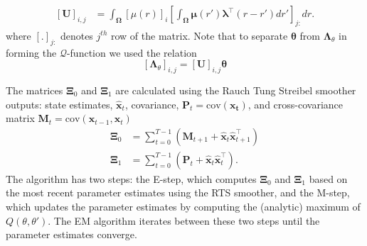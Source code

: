 \documentclass[journal]{IEEEtran}
\newcommand{\cut}[1]{\textcolor{cyan}{#1}}
\begin{document}
\begin{align}
\left[ \mathbf U\right] _{i,j}&=\int_{\boldsymbol \Omega}\left[\mu(r) \right]_i \left[\int_{\boldsymbol\Omega} \boldsymbol\mu\left(r'\right)\boldsymbol \lambda^\top \left(r-r'\right) dr'\right]_{j:} dr.
\end{align}
where $[.]_{j:} $ denotes $j^{th}$ row of the matrix. Note that to separate $\boldsymbol\theta$ from $\boldsymbol\Lambda_{\theta}$ in forming the $\mathcal{Q}$-function we used the relation
\begin{equation}
\left[ \boldsymbol\Lambda_{\theta}\right] _{i,j} =\left[ \mathbf U\right] _{i,j}\boldsymbol\theta
\end{equation}

The matrices $\boldsymbol\Xi_0$ and $\boldsymbol\Xi_1$ are calculated using the Rauch Tung Streibel smoother \cite{RAUCH1965} outputs: state estimates, $\hat{\mathbf x}_t$, covariance, $\mathbf P_t=\mathrm{cov}(\mathbf{x_t})$, and cross-covariance matrix $\mathbf M_t=\mathrm{cov}(\mathbf{x}_{t-1},\mathbf{x}_{t})$ \cite{Gibsona2005}
\begin{align}\label{eq:Xivariables}
\boldsymbol\Xi_0&=\sum_{t=0}^{T-1}\left(\mathbf M_{t+1}+\mathbf{\hat x}_t\mathbf{\hat x}_{t+1}^\top\right) \\
 \boldsymbol\Xi_1&=\sum_{t=0}^{T-1}\left(\mathbf P_t+\mathbf{\hat x}_t\mathbf{\hat x}_t^\top\right).
\end{align}
The algorithm has two steps: the E-step, which computes $\boldsymbol\Xi_0$ and $\boldsymbol\Xi_1$ based on the most recent parameter estimates using the RTS smoother, and the M-step, which updates the parameter estimates by computing the (analytic) maximum of $Q(\theta,\theta')$. The EM algorithm iterates between these two steps until the parameter estimates converge.
\end{document}
